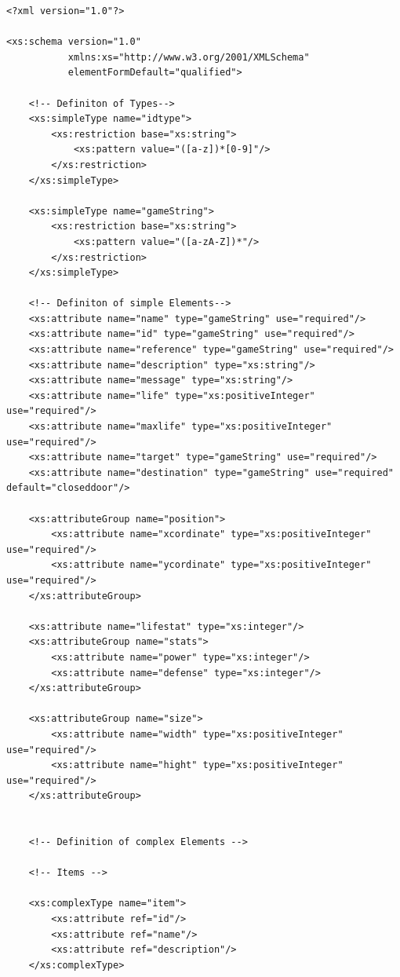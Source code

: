 \begin{lstlisting}
<?xml version="1.0"?>

<xs:schema version="1.0"
           xmlns:xs="http://www.w3.org/2001/XMLSchema"
           elementFormDefault="qualified">

    <!-- Definiton of Types-->   
    <xs:simpleType name="idtype">
        <xs:restriction base="xs:string">
            <xs:pattern value="([a-z])*[0-9]"/>
        </xs:restriction>
    </xs:simpleType>
    
    <xs:simpleType name="gameString">
        <xs:restriction base="xs:string">
            <xs:pattern value="([a-zA-Z])*"/>
        </xs:restriction>
    </xs:simpleType>
    
    <!-- Definiton of simple Elements-->
    <xs:attribute name="name" type="gameString" use="required"/>
    <xs:attribute name="id" type="gameString" use="required"/>
    <xs:attribute name="reference" type="gameString" use="required"/>
    <xs:attribute name="description" type="xs:string"/>
    <xs:attribute name="message" type="xs:string"/>
    <xs:attribute name="life" type="xs:positiveInteger" use="required"/>
    <xs:attribute name="maxlife" type="xs:positiveInteger" use="required"/>
    <xs:attribute name="target" type="gameString" use="required"/>
    <xs:attribute name="destination" type="gameString" use="required" default="closeddoor"/>
    
    <xs:attributeGroup name="position">
        <xs:attribute name="xcordinate" type="xs:positiveInteger" use="required"/>
        <xs:attribute name="ycordinate" type="xs:positiveInteger" use="required"/>
    </xs:attributeGroup>
    
    <xs:attribute name="lifestat" type="xs:integer"/>
    <xs:attributeGroup name="stats">
        <xs:attribute name="power" type="xs:integer"/>
        <xs:attribute name="defense" type="xs:integer"/>
    </xs:attributeGroup>
    
    <xs:attributeGroup name="size">
        <xs:attribute name="width" type="xs:positiveInteger" use="required"/>
        <xs:attribute name="hight" type="xs:positiveInteger" use="required"/>
    </xs:attributeGroup>
    

    <!-- Definition of complex Elements -->
    
    <!-- Items -->
     
    <xs:complexType name="item">
        <xs:attribute ref="id"/>
        <xs:attribute ref="name"/>
        <xs:attribute ref="description"/>                
    </xs:complexType>


\end{lstlisting}
